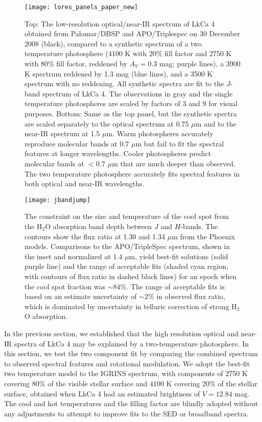 \documentclass[twocolumn]{emulateapj}%
\begin{document}
\begin{figure*}
 \centering
 \texttt{[image: lores\_panels\_paper\_new]}
 \caption{Top:  The low-resolution optical/near-IR spectrum of LkCa 4 obtained from Palomar/DBSP and APO/Triplespec on 30 December 2008 (black), compared to a synthetic spectrum of a two temperature photosphere (4100 K with 20\% fill factor and 2750 K with 80\% fill factor, reddened by $A_V=0.3$ mag; purple lines), a 3900 K spectrum reddened by 1.3 mag (blue lines), and a 3500 K spectrum with no reddening.  All synthetic spectra are fit to the $J$-band spectrum of LkCa 4. The observations in gray and the single temperature photospheres are scaled by factors of 3 and 9 for visual purposes.
 Bottom:  Same as the top panel, but the synthetic spectra are 
scaled separately to the optical spectrum at 0.75 $\mu$m and to the near-IR spectrum at 1.5 $\mu$m.  Warm photospheres accurately reproduce molecular bands at $0.7$ $\mu$m but fail to fit the spectral features at longer wavelengths.  Cooler photospheres predict molecular bands at $<0.7$ $\mu$m that are much deeper than observed.  The two temperature photosphere accurately fits spectral features in both optical and near-IR wavelengths.}
 \label{fig:lores}
\end{figure*}


\begin{figure}
 \centering
\texttt{[image: jbandjump]}
\caption{The constraint on the size and temperature of the cool spot from the H$_2$O absorption band depth between $J$ and $H$-bands.  The contours show the flux ratio at 1.30 and 1.34 $\mu$m from the Phoenix models.  Comparisons to the APO/TripleSpec spectrum, shown in the inset and normalized at 1.4 $\mu$m, yield best-fit solutions (solid purple line) and the range of acceptable fits (shaded cyan region, with contours of flux ratio in dashed black lines) for an epoch when  the cool spot fraction was $\sim 84$\%.  The range of acceptable fits is based on an estimate uncertainty of $\sim 2$\% in observed flux ratio, which is dominated by uncertainty in telluric correction of strong H$_2$O absorption. }
 \label{fig:h2ojump}
\end{figure}


In the previous section, we established that the high resolution optical and near-IR spectra of LkCa 4 may be explained by a two-temperature photosphere.  In this section, we test the two component fit by comparing the combined spectrum to observed spectral features and rotational modulation.  We adopt the best-fit two temperature model to the IGRINS spectrum, with components of 2750 K covering 80\% of the visible stellar surface and 4100 K covering 20\% of the stellar surface, obtained when LkCa 4 had an estimated brightness of $V=12.84$ mag.  The cool and hot temperatures and the filling factor are blindly adopted without any adjustments to attempt to improve fits to the SED or broadband spectra.
\end{document}
